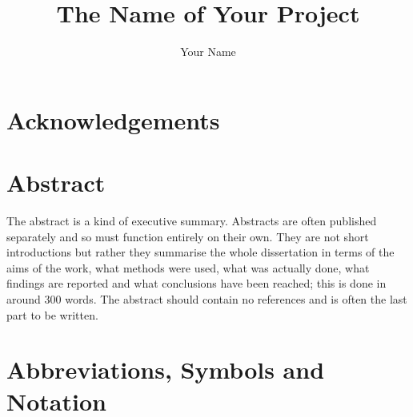 \documentclass[a4paper, 12pt]{article}
\title{The Name of Your Project}
\author{Your Name}
\institute{Name of Your University}
\begin{document}
	
\addtitlepage
\pagebreak


\tableofcontents
\pagebreak

\listoffigures
\pagebreak

\listoftables
\pagebreak



\section{Acknowledgements} %


\pagebreak


\section{Abstract} %
The abstract is a kind of executive summary. Abstracts are often published separately and so must function entirely on their own. They are not short introductions but rather they summarise the whole dissertation in terms of the aims of the work, what methods were used, what was actually done, what findings are reported and what conclusions have been reached; this is done in around 300 words. The abstract should contain no references and is often the last part to be written.

\pagebreak


\section{Abbreviations, Symbols and Notation} %


\pagebreak


\end{document}
